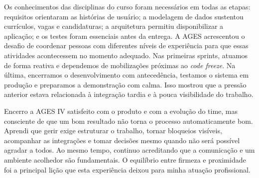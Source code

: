 Os conhecimentos das disciplinas do curso foram necessários em todas as etapas:
requisitos orientaram as histórias de usuário; a modelagem de dados sustentou
currículos, vagas e candidaturas; a arquitetura permitiu disponibilizar a aplicação;
e os testes foram essenciais antes da entrega. A AGES acrescentou o desafio de
coordenar pessoas com diferentes níveis de experiência para que essas atividades
acontecessem no momento adequado. Nas primeiras sprints, atuamos de forma reativa e
dependemos de mobilizações próximas ao \textit{code freeze}. Na última, encerramos o
desenvolvimento com antecedência, testamos o sistema em produção e preparamos a
demonstração com calma. Isso mostrou que a pressão anterior estava relacionada à
integração tardia e à pouca visibilidade do trabalho.

Encerro a AGES IV satisfeito com o produto e com a evolução do time, mas consciente
de que um bom resultado não torna o processo automaticamente bom. Aprendi que gerir
exige estruturar o trabalho, tornar bloqueios visíveis, acompanhar as integrações e
tomar decisões mesmo quando não será possível agradar a todos. Ao mesmo tempo,
continuo acreditando que a comunicação e um ambiente acolhedor são fundamentais. O
equilíbrio entre firmeza e proximidade foi a principal lição que esta experiência
deixou para minha atuação profissional.
